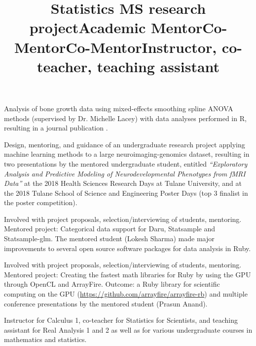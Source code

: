 \documentclass[overlapped, line, 10pt]{res} %
\begin{document}
\begin{resume}
\title{Statistics MS research project}
\begin{position}
  Analysis of bone growth data using mixed-effects smoothing spline ANOVA methods (supervised by Dr. Michelle Lacey) with data analyses performed in R, resulting in a journal publication \cite{sammarco2015}.
\end{position}

\title{Academic Mentor}
\begin{position}
  Design, mentoring, and guidance of an undergraduate research project applying machine learning methods to a large neuroimaging-genomics dataset, resulting in two presentations by the mentored undergraduate student, entitled \emph{``Exploratory Analysis and Predictive Modeling of Neurodevelopmental Phenotypes from fMRI Data''} at the 2018 Health Sciences Research Days at Tulane University, and at the 2018 Tulane School of Science and Engineering Poster Days (top 3 finalist in the poster competition).
\end{position}

\title{Co-Mentor}
\begin{position}
  Involved with project proposals, selection/interviewing of students, mentoring. Mentored project: Categorical data support for Daru, Statsample and Statsample-glm. The mentored student (Lokesh Sharma) made major improvements to several open source software packages for data analysis in Ruby.
\end{position}

\title{Co-Mentor}
\begin{position}
  Involved with project proposals, selection/interviewing of students, mentoring. Mentored project: Creating the fastest math libraries for Ruby by using the GPU through OpenCL and ArrayFire. Outcome: a Ruby library for scientific computing on the GPU (\url{https://github.com/arrayfire/arrayfire-rb}) and multiple conference presentations by the mentored student (Prasun Anand).
\end{position}

\title{Instructor, co-teacher, teaching assistant}
\begin{position}
  Instructor for Calculus 1, co-teacher for Statistics for Scientists, and teaching assistant for Real Analysis 1 and 2 as well as for various undergraduate courses in mathematics and statistics.
\end{position}


\end{resume}
\end{document}
